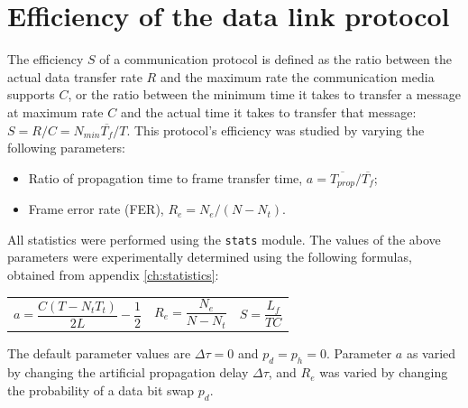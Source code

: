 \documentclass[a4paper, 11pt]{report}
\begin{document}
\section{Efficiency of the data link protocol} \label{sec:Efficiency}

The efficiency $S$ of a communication protocol is defined as the ratio between the actual data transfer rate $R$ and the maximum rate the communication media supports $C$, or the ratio between the minimum time it takes to transfer a message at maximum rate $C$ and the actual time it takes to transfer that message: $S = R/C = N_{min}\overline{T_f}/T$. This protocol's efficiency was studied by varying the following parameters:
\begin{itemize}
	\itemsep0em
	\item Ratio of propagation time to frame transfer time, $a = \overline{T_{prop}}/\overline{T_f}$;
	\item Frame error rate (FER), $R_e = N_e/(N-N_t)$.
\end{itemize}

All statistics were performed using the \texttt{stats} module. The values of the above parameters were experimentally determined using the following formulas, obtained from appendix \ref{ch:statistics}:
\begin{center}
	\vspace{-10pt}
	\begin{tabular}{c c c}
		\begin{minipage}{40mm}\begin{equation*}
			a = \frac{C(T - N_t T_t)}{2 L} - \frac{1}{2}
		\end{equation*}\end{minipage} &
		\begin{minipage}{25mm}\begin{equation*}
			R_e = \frac{N_e}{N-N_t}
		\end{equation*}\end{minipage} &
		\begin{minipage}{25mm}\begin{equation*}
			S = \frac{L_f}{T C}
		\end{equation*}\end{minipage}
	\end{tabular}
\end{center}

The default parameter values are $\Delta \tau = 0$ and $p_d=p_h=0$. Parameter $a$ as varied by changing the artificial propagation delay $\Delta \tau$, and $R_e$ was varied by changing the probability of a data bit swap $p_d$.
\end{document}
